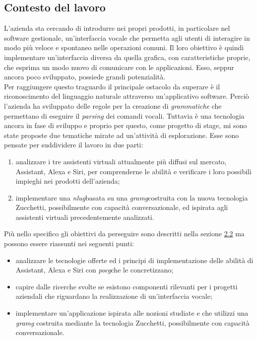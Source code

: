 \subsection{Contesto del lavoro}
L'azienda sta cercando di introdurre nei propri prodotti, in particolare nel software gestionale, un'interfaccia vocale che permetta agli utenti di interagire in modo più veloce e spontaneo nelle operazioni comuni. Il loro obiettivo è quindi implementare un'interfaccia diversa da quella grafica, con caratteristiche proprie, che esprima un modo nuovo di comunicare con le applicazioni. Esso, seppur ancora poco sviluppato, possiede grandi potenzialità. \\
Per raggiungere questo traguardo il principale ostacolo da superare è il riconoscimento del linguaggio naturale attraverso un'applicativo software. Perciò l'azienda ha sviluppato delle regole per la creazione di \emph{grammatiche} che permettano di eseguire il \emph{parsing} dei comandi vocali. Tuttavia è una tecnologia ancora in fase di sviluppo e proprio per questo, come progetto di stage, mi sono state proposte due tematiche mirate ad un'attività di esplorazione. Esse sono pensate per suddividere il lavoro in due parti:
\begin{enumerate}
	\item analizzare i tre assistenti virtuali attualmente più diffusi sul mercato, Assistant, Alexa e Siri, per comprenderne le abilità e verificare i loro possibili impieghi nei prodotti dell'azienda;
	\item implementare una \emph{\gls{nlug}}\glsfirstoccur basata su una \emph{\gls{gramg}}\glsfirstoccur costruita con la nuova tecnologia Zucchetti, possibilmente con capacità conversazionale, ed ispirata agli assistenti virtuali precedentemente analizzati.
\end{enumerate}
Più nello specifico gli obiettivi da perseguire sono descritti nella sezione \hyperref[section:obiettivi]{2.2} ma possono essere riassunti nei seguenti punti:
\begin{itemize}
	\item analizzare le tecnologie offerte ed i principi di implementazione delle abilità di Assistant, Alexa e Siri con \emph{\gls{pocg}}\glsfirstoccur che le concretizzano;
	\item capire dalle ricerche svolte se esistono componenti rilevanti per i progetti aziendali che riguardano la realizzazione di un'interfaccia vocale;
	\item implementare un'applicazione ispirata alle nozioni studiate e che utilizzi una \emph{\gls{gramg}} costruita mediante la tecnologia Zucchetti, possibilmente con capacità conversazionale.
\end{itemize}
